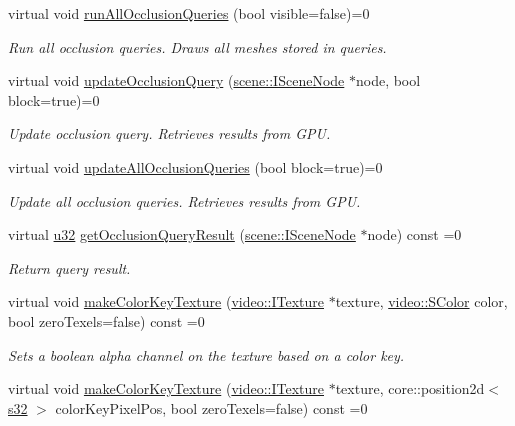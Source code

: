 \begin{DoxyCompactItemize}
virtual void \hyperlink{classirr_1_1video_1_1IVideoDriver_ae2ba500924a7d74fe74dd4724b737628}{run\+All\+Occlusion\+Queries} (bool visible=false)=0
\begin{DoxyCompactList}\small\item\em Run all occlusion queries. Draws all meshes stored in queries. \end{DoxyCompactList}\item 
virtual void \hyperlink{classirr_1_1video_1_1IVideoDriver_a626061128fcf018516c6d931bd616ea7}{update\+Occlusion\+Query} (\hyperlink{classirr_1_1scene_1_1ISceneNode}{scene\+::\+I\+Scene\+Node} $\ast$node, bool block=true)=0
\begin{DoxyCompactList}\small\item\em Update occlusion query. Retrieves results from G\+PU. \end{DoxyCompactList}\item 
virtual void \hyperlink{classirr_1_1video_1_1IVideoDriver_ab611513a8cdb3cc62c29b864de0d1de7}{update\+All\+Occlusion\+Queries} (bool block=true)=0
\begin{DoxyCompactList}\small\item\em Update all occlusion queries. Retrieves results from G\+PU. \end{DoxyCompactList}\item 
virtual \hyperlink{namespaceirr_a0416a53257075833e7002efd0a18e804}{u32} \hyperlink{classirr_1_1video_1_1IVideoDriver_a149ea92e04b2d0fe18bf5b584ccf6de4}{get\+Occlusion\+Query\+Result} (\hyperlink{classirr_1_1scene_1_1ISceneNode}{scene\+::\+I\+Scene\+Node} $\ast$node) const =0
\begin{DoxyCompactList}\small\item\em Return query result. \end{DoxyCompactList}\item 
virtual void \hyperlink{classirr_1_1video_1_1IVideoDriver_a701e7d2101eb26888f57928134bc2ffb}{make\+Color\+Key\+Texture} (\hyperlink{classirr_1_1video_1_1ITexture}{video\+::\+I\+Texture} $\ast$texture, \hyperlink{classirr_1_1video_1_1SColor}{video\+::\+S\+Color} color, bool zero\+Texels=false) const =0
\begin{DoxyCompactList}\small\item\em Sets a boolean alpha channel on the texture based on a color key. \end{DoxyCompactList}\item 
virtual void \hyperlink{classirr_1_1video_1_1IVideoDriver_aed772902f4fe1185b44ce81b9b0b9add}{make\+Color\+Key\+Texture} (\hyperlink{classirr_1_1video_1_1ITexture}{video\+::\+I\+Texture} $\ast$texture, core\+::position2d$<$ \hyperlink{namespaceirr_ac66849b7a6ed16e30ebede579f9b47c6}{s32} $>$ color\+Key\+Pixel\+Pos, bool zero\+Texels=false) const =0

\end{DoxyCompactItemize}
